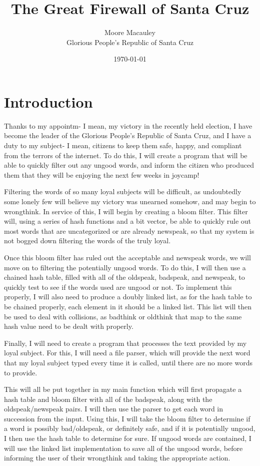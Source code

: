 \documentclass[11pt]{article}
\title{The Great Firewall of Santa Cruz}
\author{Moore Macauley \\ Glorious People's Republic of Santa Cruz}
\date{\today}
\begin{document}
\maketitle

\section{Introduction}

Thanks to my appointm- I mean, my victory in the recently held election, I have become the leader of the Glorious People's Republic of Santa Cruz, and I have a duty to my subject- I mean, citizens to keep them safe, happy, and compliant from the terrors of the internet. To do this, I will create a program that will be able to quickly filter out any ungood words, and inform the citizen who produced them that they will be enjoying the next few weeks in joycamp!

Filtering the words of so many loyal subjects will be difficult, as undoubtedly some lonely few will believe my victory was unearned somehow, and may begin to wrongthink. In service of this, I will begin by creating a bloom filter. This filter will, using a series of hash functions and a bit vector, be able to quickly rule out most words that are uncategorized or are already newspeak, so that my system is not bogged down filtering the words of the truly loyal.

Once this bloom filter has ruled out the acceptable and newspeak words, we will move on to filtering the potentially ungood words. To do this, I will then use a chained hash table, filled with all of the oldspeak, badspeak, and newspeak, to quickly test to see if the words used are ungood or not. To implement this properly, I will also need to produce a doubly linked list, as for the hash table to be chained properly, each element in it should be a linked list. This list will then be used to deal with collisions, as badthink or oldthink that map to the same hash value need to be dealt with properly.

Finally, I will need to create a program that processes the text provided by my loyal subject. For this, I will need a file parser, which will provide the next word that my loyal subject typed every time it is called, until there are no more words to provide.

This will all be put together in my main function which will first propagate a hash table and bloom filter with all of the badspeak, along with the oldspeak/newspeak pairs. I will then use the parser to get each word in succession from the input. Using this, I will take the bloom filter to determine if a word is possibly bad/oldspeak, or definitely safe, and if it is potentially ungood, I then use the hash table to determine for sure. If ungood words are contained, I will use the linked list implementation to save all of the ungood words, before informing the user of their wrongthink and taking the appropriate action.
\end{document}
